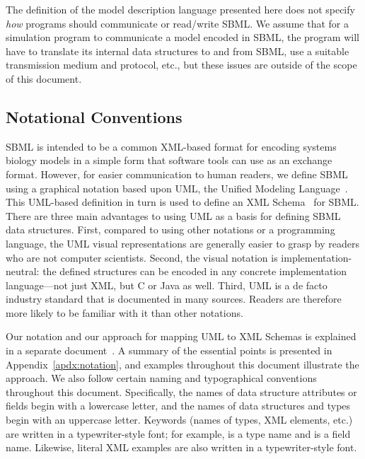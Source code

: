 \documentclass[10pt]{cekarticle}
\begin{document}
The definition of the model description language presented here does not
specify \emph{how} programs should communicate or read/write SBML.  We
assume that for a simulation program to communicate a model encoded in
SBML, the program will have to translate its internal data structures to
and from SBML, use a suitable transmission medium and protocol, etc., but
these issues are outside of the scope of this document.


\subsection{Notational Conventions}

SBML is intended to be a common XML-based format for encoding systems
biology models in a simple form that software tools can use as an exchange
format.  However, for easier communication to human readers, we define SBML
using a graphical notation based upon UML, the Unified Modeling
Language~\citep{eriksson:1998,oestereich:1999}.  This UML-based definition
in turn is used to define an XML
Schema~\citep{biron:2000,fallside:2000,thompson:2000} for SBML.  There are
three main advantages to using UML as a basis for defining SBML data
structures.  First, compared to using other notations or a programming
language, the UML visual representations are generally easier to grasp by
readers who are not computer scientists.  Second, the visual notation is
implementation-neutral: the defined structures can be encoded in any
concrete implementation language---not just XML, but C or Java as well.
Third, UML is a de facto industry standard that is documented in many
sources.  Readers are therefore more likely to be familiar with it than
other notations.

Our notation and our approach for mapping UML to XML Schemas is explained
in a separate document~\citep{hucka:2000b}.  A summary of the essential
points is presented in Appendix~\ref{apdx:notation}, and examples
throughout this document illustrate the approach.  We also follow certain
naming and typographical conventions throughout this document.
Specifically, the names of data structure attributes or fields begin with a
lowercase letter, and the names of data structures and types begin with an
uppercase letter.  Keywords (names of types, XML elements, etc.) are
written in a typewriter-style font; for example,  is a
type name and  is a field name.  Likewise, literal XML
examples are also written in a typewriter-style font.
\end{document}

